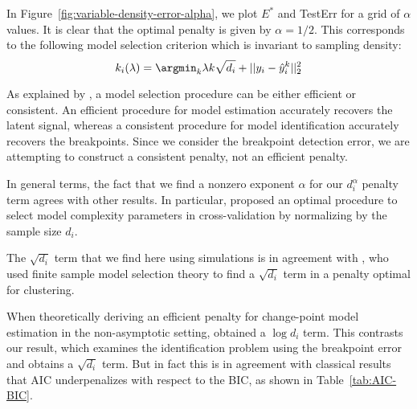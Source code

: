 \documentclass{article}
\begin{document}
In Figure~\ref{fig:variable-density-error-alpha}, we plot $E^*$ and
TestErr for a grid of $\alpha$ values.
It is clear that the optimal penalty is given by $\alpha=1/2$. This
corresponds to the following model selection criterion which is
invariant to sampling density:
\begin{equation}
  \label{eq:var_dens_opt_pen}
  k_i(\lambda) = \argmin_k \lambda k \sqrt{d_i}+||y_i-\hat y_i^k||^2_2
\end{equation}


\newpage

As explained by \citet{sylvain-survey}, a model selection procedure
can be either efficient or consistent. An efficient procedure for
model estimation accurately recovers the latent signal, whereas a
consistent procedure for model identification accurately recovers the
breakpoints. Since we consider the breakpoint detection error, we are
attempting to construct a consistent penalty, not an efficient
penalty.

In general terms, the fact that we find a nonzero exponent $\alpha$
for our $d_i^\alpha$ penalty term agrees with other results. In
particular, \citet{vfold} proposed an optimal procedure to select model
complexity parameters in cross-validation by normalizing by the sample
size $d_i$. 

The $\sqrt{d_i}$ term that we find here using simulations is in
agreement with \citet{aurelie}, who used finite sample model selection
theory to find a $\sqrt{d_i}$ term in a penalty optimal for
clustering.

When theoretically deriving an efficient penalty for change-point
model estimation in the non-asymptotic setting, \citet{lebarbier}
obtained a $\log d_i$ term. This contrasts our result, which examines
the identification problem using the breakpoint error and obtains a
$\sqrt{d_i}$ term. But in fact this is in agreement with classical
results that AIC underpenalizes with respect to the BIC, as shown in
Table~\ref{tab:AIC-BIC}.
\end{document}
